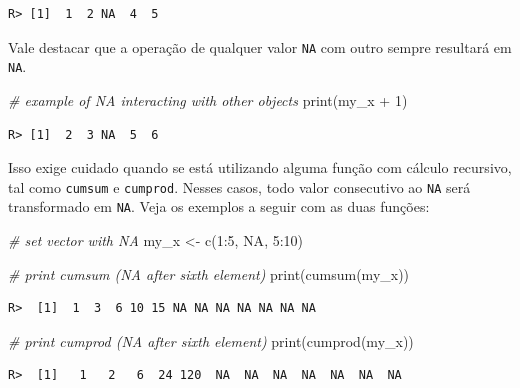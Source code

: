 \documentclass[
  11pt,
]{book}
\newenvironment{Shaded}{\begin{snugshade}}{\end{snugshade}}
\newcommand{\CommentTok}[1]{\textcolor[rgb]{0.37,0.37,0.37}{\textit{#1}}}
\newcommand{\ConstantTok}[1]{\textcolor[rgb]{0,0,0}{#1}}
\newcommand{\DecValTok}[1]{\textcolor[rgb]{0.06,0.06,0.06}{#1}}
\newcommand{\FunctionTok}[1]{\textcolor[rgb]{0,0,0}{#1}}
\newcommand{\NormalTok}[1]{#1}
\newcommand{\OtherTok}[1]{\textcolor[rgb]{0.37,0.37,0.37}{#1}}
\newcommand{\SpecialCharTok}[1]{\textcolor[rgb]{0,0,0}{#1}}
\begin{document}
\begin{verbatim}
R> [1]  1  2 NA  4  5
\end{verbatim}

Vale destacar que a operação de qualquer valor \texttt{NA} com outro sempre resultará em \texttt{NA}.

\begin{Shaded}
\begin{Highlighting}[]
\CommentTok{\# example of NA interacting with other objects}
\FunctionTok{print}\NormalTok{(my\_x }\SpecialCharTok{+} \DecValTok{1}\NormalTok{)}
\end{Highlighting}
\end{Shaded}

\begin{verbatim}
R> [1]  2  3 NA  5  6
\end{verbatim}

Isso exige cuidado quando se está utilizando alguma função com cálculo recursivo, tal como \texttt{cumsum} e \texttt{cumprod}. Nesses casos, todo valor consecutivo ao \texttt{NA} será transformado em \texttt{NA}. Veja os exemplos a seguir com as duas funções:

\begin{Shaded}
\begin{Highlighting}[]
\CommentTok{\# set vector with NA}
\NormalTok{my\_x }\OtherTok{\textless{}{-}} \FunctionTok{c}\NormalTok{(}\DecValTok{1}\SpecialCharTok{:}\DecValTok{5}\NormalTok{, }\ConstantTok{NA}\NormalTok{, }\DecValTok{5}\SpecialCharTok{:}\DecValTok{10}\NormalTok{)}

\CommentTok{\# print cumsum (NA after sixth element)}
\FunctionTok{print}\NormalTok{(}\FunctionTok{cumsum}\NormalTok{(my\_x))}
\end{Highlighting}
\end{Shaded}

\begin{verbatim}
R>  [1]  1  3  6 10 15 NA NA NA NA NA NA NA
\end{verbatim}

\begin{Shaded}
\begin{Highlighting}[]
\CommentTok{\# print cumprod (NA after sixth element)}
\FunctionTok{print}\NormalTok{(}\FunctionTok{cumprod}\NormalTok{(my\_x))}
\end{Highlighting}
\end{Shaded}

\begin{verbatim}
R>  [1]   1   2   6  24 120  NA  NA  NA  NA  NA  NA  NA
\end{verbatim}
\end{document}
